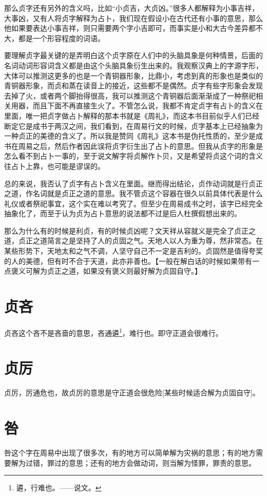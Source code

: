 \documentclass[12pt,oneside]{book}
\begin{document}
那么贞字还有另外的含义吗，比如“小贞吉，大贞凶。”很多人都解释为小事吉祥，大事凶，又有人将贞字解释为占卜，我们现在假设小在古代还有小事的意思，那么他如果要表达小事吉祥，则只需要两个字小吉即可，而事实是小和大古今差异都不大，都是一个形容程度的词语。

要理解贞字最关键的是弄明白这个贞字原在人们中的头脑具象是何种情景，后面的名词动词形容词含义都是由这个头脑具象衍生出来的。我观察汉典上的字源字形，大体可以推测这更多的也是一个青铜器形象，比鼎小，考虑到真的形象也是类似的青铜器形象，而贞和蒸在读音上的接近，这些都不是偶然。贞字有些字形象会发现去掉了火，或者两个脚抬得很高，我可以推测这个青铜器后面渐渐成了一种祭祀相关用器，而且下面不再直接生火了。不管怎么说，我都不肯定贞字有占卜的含义在里面，唯一把贞字做占卜解释的那本书就是《周礼》，而这本书目前似乎人们已经断定它是成书于两汉之间，我们看到，在周易行文的时候，贞字基本上已经抽象为一种贞正的美德的含义了。所以我是赞同《周礼》这本书是伪托性质的，至少是成书在周易之后，然后作者因此误将贞字衍生出了占卜的意思。但我从贞字的形象是怎么看不到占卜一事的，至于说文解字将贞解作卜贝，又是希望将贞这个词的含义往占卜上靠，也可能是谬误的。

总的来说，我否认了贞字有占卜含义在里面。继而得出结论，贞作动词就是行贞正之道，作名词就是贞正之道的意思。我不管贞这个容器在很久以前具体代表是什么礼仪或者祭祀事宜，这个实在难以考究了。但至少在周易成书之时，该字已经完全抽象化了，而至于认为贞为占卜意思的说法都不过是后人杜撰假想出来的。

那么为什么有的时候是利贞，有的时候贞凶呢？文天祥从容就义是完全了贞正之道，贞正之道简言之是坚持了人的贞固之气。天地人以人为重为尊，然非常态。在某些形势下，天地太和之气不调，人坚守自己不一定是吉利的。贞固然是值得夸奖的人的美德，但有时不合于天道，此亦非善也。【一般在解白话的时候如果带有一点褒义可解为贞正之道，如果没有褒义则最好解为贞固自守。】


\section{贞吝}
贞吝这个吝不是吝啬的意思，吝通遴\footnote{遴，行难也。——说文。}，难行也。即守正道会很难行。

\section{贞厉}
贞厉，厉通危也，故贞厉的意思是守正道会很危险[某些时候适合解为贞固自守]。

\section{咎}
咎这个字在周易中出现了很多次，有的地方可以简单解为灾祸的意思；有的地方需要解为过错，罪过的意思；还有的地方会做动词，则当解为怪罪，罪责的意思。
\end{document}

